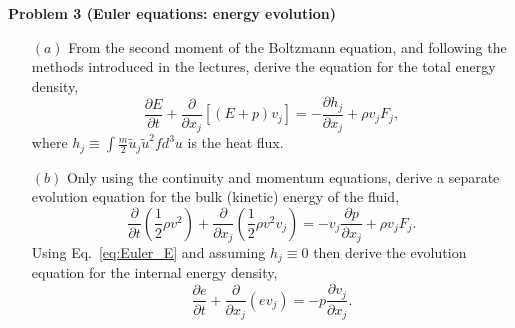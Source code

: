 \documentclass[letter,11pt]{article}
\begin{document}
\vspace{1cm}

{\noindent\large\textbf{Problem 3 (Euler equations: energy evolution)}}\\

\begin{itemize}
  \item[$(a)$] From the second moment of the Boltzmann equation, and following the methods introduced in the lectures, derive the equation for the total energy density,
  \begin{equation}
    \frac{\partial E}{\partial t} + \frac{\partial}{\partial x_j}\left[(E+p)v_j\right] = -\frac{\partial h_j}{\partial x_j} + \rho v_j F_j, \label{eq:Euler_E}
  \end{equation}
  where $h_j \equiv \int \frac{m}{2}\tilde{u}_j\tilde{u}^2 f d^3u$ is the heat flux.
  \item[$(b)$]
    Only using the continuity and momentum equations, derive a separate evolution equation for the bulk (kinetic) energy of the fluid,
    \begin{equation}
      \frac{\partial }{\partial t}\left(\frac{1}{2}\rho v^2\right) + \frac{\partial}{\partial x_j}\left(\frac{1}{2}\rho v^2 v_j\right) = -v_j\frac{\partial p}{\partial x_j} + \rho v_j F_j.
    \end{equation}
    Using Eq.~\eqref{eq:Euler_E} and assuming $h_j\equiv 0$ then derive the evolution equation for the internal energy density,
    \begin{equation}
      \frac{\partial e}{\partial t} + \frac{\partial}{\partial x_j}(e v_j) = -p\frac{\partial v_j}{\partial x_j}.
    \end{equation}
  \end{itemize}
\end{document}
